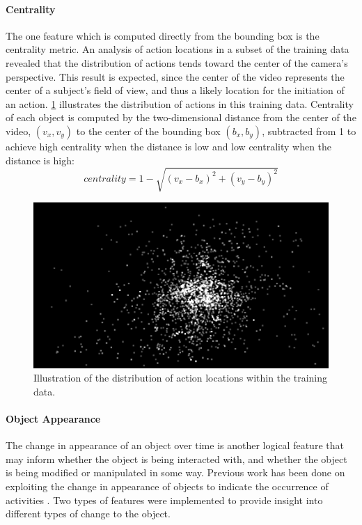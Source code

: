 \documentclass[12pt]{report}
\begin{document}
\paragraph{Centrality}
The one feature which is computed directly from the bounding box is the centrality metric. An analysis of action locations in a subset of the training data revealed that the distribution of actions tends toward the center of the camera's perspective. This result is expected, since the center of the video represents the center of a subject's field of view, and thus a likely location for the initiation of an action. \ref{action_locations} illustrates the distribution of actions in this training data. Centrality of each object is computed by the two-dimensional distance from the center of the video, $(v_x, v_y)$ to the center of the bounding box $(b_x, b_y)$, subtracted from 1 to achieve high centrality when the distance is low and low centrality when the distance is high: \\
\begin{equation}
    centrality = 1 - \sqrt{(v_x - b_x)^2 + (v_y - b_y)^2}
\end{equation}

\begin{figure}[t]
\centerline{\includegraphics[width=.9\linewidth]{figure/action_locations.png}}
\caption{Illustration of the distribution of action locations within the training data.}
\label{action_locations}
\end{figure}

\paragraph{Object Appearance}
The change in appearance of an object over time is another logical feature that may inform whether the object is being interacted with, and whether the object is being modified or manipulated in some way. Previous work has been done on exploiting the change in appearance of objects to indicate the occurrence of activities \cite{Pirsiavash2012}. Two types of features were implemented to provide insight into different types of change to the object. 
\end{document}

